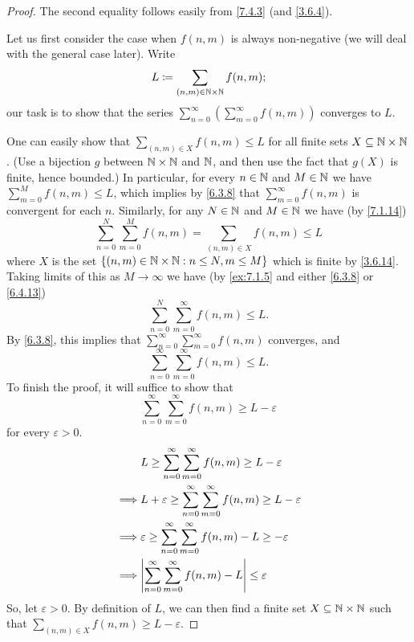\begin{proof}
  The second equality follows easily from \cref{7.4.3} (and \cref{3.6.4}).

  Let us first consider the case when \(f(n, m)\) is always non-negative (we will deal with the general case later).
  Write
  \[
    L \coloneqq \sum_{(n, m) \in \mathbb{N} \times \mathbb{N}} f(n, m);
  \]
  our task is to show that the series \(\sum_{n = 0}^\infty (\sum_{m = 0}^\infty f(n, m))\) converges to \(L\).

  One can easily show that \(\sum_{(n, m) \in X} f(n, m) \leq L\) for all finite sets \(X \subseteq \mathbb{N} \times \mathbb{N}\).
  (Use a bijection \(g\) between \(\mathbb{N} \times \mathbb{N}\) and \(\mathbb{N}\), and then use the fact that \(g(X)\) is finite, hence bounded.)
  In particular, for every \(n \in \mathbb{N}\) and \(M \in \mathbb{N}\) we have \(\sum_{m = 0}^M f(n, m) \leq L\), which implies by \cref{6.3.8} that \(\sum_{m = 0}^\infty f(n, m)\) is convergent for each \(n\).
  Similarly, for any \(N \in \mathbb{N}\) and \(M \in \mathbb{N}\) we have (by \cref{7.1.14})
  \[
    \sum_{n = 0}^N \sum_{m = 0}^M f(n, m) = \sum_{(n, m) \in X} f(n, m) \leq L
  \]
  where \(X\) is the set \(\{(n,m) \in \mathbb{N} \times \mathbb{N} : n \leq N, m \leq M\}\) which is finite by \cref{3.6.14}.
  Taking limits of this as \(M \to \infty\) we have (by \cref{ex:7.1.5} and either \cref{6.3.8} or \cref{6.4.13})
  \[
    \sum_{n = 0}^N \sum_{m = 0}^\infty f(n, m) \leq L.
  \]
  By \cref{6.3.8}, this implies that \(\sum_{n = 0}^\infty \sum_{m = 0}^\infty f(n, m)\) converges, and
  \[
    \sum_{n = 0}^\infty \sum_{m = 0}^\infty f(n, m) \leq L.
  \]
  To finish the proof, it will suffice to show that
  \[
    \sum_{n = 0}^\infty \sum_{m = 0}^\infty f(n, m) \geq L - \varepsilon
  \]
  for every \(\varepsilon > 0\).
  \begin{align*}
             & L \geq \sum_{n = 0}^\infty \sum_{m = 0}^\infty f(n, m) \geq L - \varepsilon               \\
    \implies & L + \varepsilon \geq \sum_{n = 0}^\infty \sum_{m = 0}^\infty f(n, m) \geq L - \varepsilon \\
    \implies & \varepsilon \geq \sum_{n = 0}^\infty \sum_{m = 0}^\infty f(n, m) - L \geq -\varepsilon    \\
    \implies & \abs{\sum_{n = 0}^\infty \sum_{m = 0}^\infty f(n, m) - L} \leq \varepsilon                \\
  \end{align*}
  So, let \(\varepsilon > 0\).
  By definition of \(L\), we can then find a finite set \(X \subseteq \mathbb{N} \times \mathbb{N}\) such that \(\sum_{(n, m) \in X} f(n, m) \geq L - \varepsilon\).

\end{proof}
